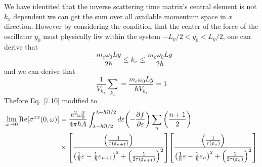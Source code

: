 \noindent
We have identited that the inverse scattering time matrix's central element is not $k_x$ dependent we can get the sum over all available momentum space in $x$ direction. However by considering the condition that the center of the force of the oscillator $y_0$ must physically liw within the system $-L_y/2 < y_0 < L_y/2$, one can derive that
\begin{equation} \label{7.11}
 -\frac{m_e\omega_0 Ly}{2\hbar} \leq k_x \leq \frac{m_e\omega_0 Ly}{2\hbar}
\end{equation}
and we can derive that
\begin{equation} \label{7.12}
    \frac{1}{V_{k_x}}\sum_{k_x} = \frac{m_e\omega_0 Ly}{\hbar V_{k_x}} = 1
\end{equation}
Thefore Eq. \eqref{7.10} modified to
\begin{equation} \label{7.13}
  \begin{aligned}
    \lim_{\omega \to 0}
    \text{Re}[{\sigma}^{xx}(0,\omega)] & =
    \frac{e^2 \omega_0^2}{4\pi\hbar A}
    \int_{\lambda-\hbar\Omega/2}^{\lambda+ \hbar\Omega/2} d\varepsilon
    \qty(
    -\frac{\partial f}{\partial \varepsilon})
    \sum_{n}
    \qty(\frac{n+1}{2})
    \\
    & \times
    \qty[
    \frac{\qty(\frac{1}{\tau(\varepsilon_{n+1})})
    }
    {
    \qty(
    \frac{1}{\hbar}\varepsilon -
    \frac{1}{\hbar}\varepsilon_{n+1}
    )^2
    + \qty(\frac{1}{2\tau(\varepsilon_{n+1})})^2
    }]
    \qty[
    \frac{\qty(\frac{1}{\tau(\varepsilon_{n})})
    }
    {
    \qty(
    \frac{1}{\hbar}\varepsilon -
    \frac{1}{\hbar}\varepsilon_{n}
    )^2
    + \qty(\frac{1}{2\tau(\varepsilon_{n})})^2
    }]
  \end{aligned}
\end{equation}

